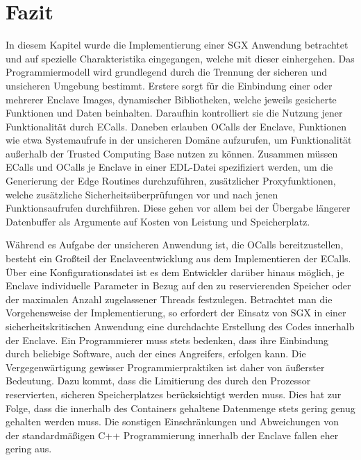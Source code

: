 \section{Fazit}

In diesem Kapitel wurde die Implementierung einer \ac{SGX} Anwendung betrachtet und auf spezielle Charakteristika eingegangen, welche mit dieser einhergehen. Das Programmiermodell wird grundlegend durch die Trennung der sicheren und unsicheren Umgebung bestimmt. Erstere sorgt für die Einbindung einer oder mehrerer Enclave Images, dynamischer Bibliotheken, welche jeweils gesicherte Funktionen und Daten beinhalten. Daraufhin kontrolliert sie die Nutzung jener Funktionalität durch \acp{ECall}. Daneben erlauben \acp{OCall} der Enclave, Funktionen wie etwa Systemaufrufe in der unsicheren Domäne aufzurufen, um Funktionalität außerhalb der Trusted Computing Base nutzen zu können. Zusammen müssen \acp{ECall} und \acp{OCall} je Enclave in einer \ac{EDL}-Datei spezifiziert werden, um die Generierung der Edge Routines durchzuführen, zusätzlicher Proxyfunktionen, welche zusätzliche Sicherheitsüberprüfungen vor und nach jenen Funktionsaufrufen durchführen. Diese gehen vor allem bei der Übergabe längerer Datenbuffer als Argumente auf Kosten von Leistung und Speicherplatz.

Während es Aufgabe der unsicheren Anwendung ist, die \acp{OCall} bereitzustellen, besteht ein Großteil der Enclaveentwicklung aus dem Implementieren der \acp{ECall}. Über eine Konfigurationsdatei ist es dem Entwickler darüber hinaus möglich, je Enclave individuelle Parameter in Bezug auf den zu reservierenden Speicher oder der maximalen Anzahl zugelassener Threads festzulegen. Betrachtet man die Vorgehensweise der Implementierung, so erfordert der Einsatz von \ac{SGX} in einer sicherheitskritischen Anwendung eine durchdachte Erstellung des Codes innerhalb der Enclave. Ein Programmierer muss stets bedenken, dass ihre Einbindung durch beliebige Software, auch der eines Angreifers, erfolgen kann. Die Vergegenwärtigung gewisser Programmierpraktiken ist daher von äußerster Bedeutung. Dazu kommt, dass die Limitierung des durch den Prozessor reservierten, sicheren Speicherplatzes berücksichtigt werden muss. Dies hat zur Folge, dass die innerhalb des Containers gehaltene Datenmenge stets gering genug gehalten werden muss. Die sonstigen Einschränkungen und Abweichungen von der standardmäßigen C++ Programmierung innerhalb der Enclave fallen eher gering aus.